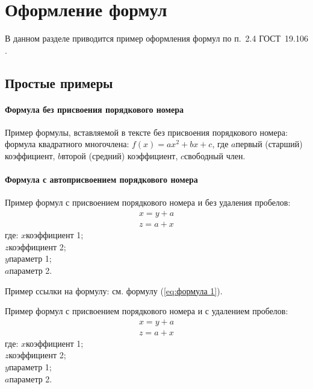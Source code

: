 \newpage\section{Оформление формул}

В данном разделе приводится пример оформления формул по п.~2.4 ГОСТ~19.106 \cite{gost19106}.

\subsection{Простые примеры}

\paragraph{Формула без присвоения порядкового номера}

Пример формулы, вставляемой в тексте без присвоения порядкового номера: формула квадратного многочлена: $f(x) = ax^2 + bx + c$, где $a$\mdash первый (старший) коэффициент, $b$\mdash второй (средний) коэффициент, $c$\mdash свободный член.

\paragraph{Формула с автоприсвоением порядкового номера}
Пример формул с присвоением порядкового номера и без удаления пробелов:
\begin{align}
	x = y+a \label{eq:формула 1}\\
	z = a+x \label{eq:формула 2}
\end{align}
\noindent где: $x$\ndash коэффициент 1; \\
\indent $z$\ndash коэффициент 2;\\
\indent $y$\ndash параметр 1;\\
\indent $a$\ndash параметр 2.

Пример ссылки на формулу: см. формулу (\ref{eq:формула 1}).

Пример формул с присвоением порядкового номера и с удалением пробелов:
{\zerodisplayskips
	\begin{align}
	x = y+a \label{eq:формула 3}\\
	z = a+x \label{eq:формула 4}
	\end{align}
}%
\noindent где: $x$\ndash коэффициент 1; \\
\indent $z$\ndash коэффициент 2;\\
\indent $y$\ndash параметр 1;\\
\indent $a$\ndash параметр 2.

